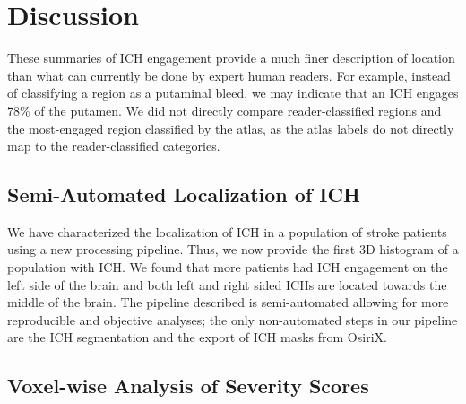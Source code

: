 \documentclass[10pt]{article}\usepackage[]{graphicx}\usepackage[]{color}
\begin{document}
\section{Discussion}
These summaries of ICH engagement provide a much finer description of location than what can currently be done by expert human readers.  For example, instead of classifying a region as a putaminal bleed, we may indicate that an ICH engages 78\% of the putamen.  We did not directly compare reader-classified regions and the most-engaged region classified by the atlas, as the atlas labels do not directly map to the reader-classified categories.

\subsection{Semi-Automated Localization of ICH}

We have characterized the localization of ICH in a population of stroke patients using a new processing pipeline.  Thus, we now provide the first 3D histogram of a population with ICH.  We found that more patients had ICH engagement on the left side of the brain and both left and right sided ICHs are located towards the middle of the brain.  
The pipeline described is semi-automated allowing for more reproducible and objective analyses; the only non-automated steps in our pipeline are the ICH segmentation and the export of ICH masks from OsiriX.  


 



\subsection{Voxel-wise Analysis of Severity Scores}
\end{document}

